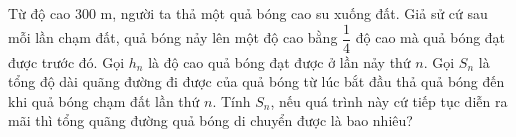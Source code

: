 \begin{bt}%
%
	Từ độ cao $300$ m, người ta thả một quả bóng cao su xuống đất. Giả sử cứ sau mỗi lần chạm đất, quả bóng nảy lên một độ cao bằng $\dfrac{1}{4}$ độ cao mà quả bóng đạt được trước đó. Gọi $h_n$ là độ cao quả bóng đạt được ở lần nảy thứ $n$. Gọi $S_n$ là tổng độ dài quãng đường đi được của quả bóng từ lúc bắt đầu thả quả bóng đến khi quả bóng chạm đất lần thứ $n$. Tính $S_n$, nếu quá trình này cứ tiếp tục diễn ra mãi thì tổng quãng đường quả bóng di chuyển được là bao nhiêu?
\end{bt}
